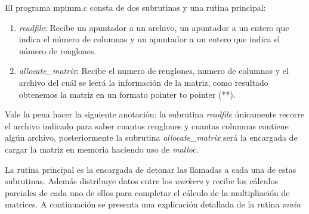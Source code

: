 \documentclass[DIV=calc, paper=letter, fontsize=11pt, twocolumn]{scrartcl}
\begin{document}
El programa mpimm.c consta de dos subrutinas y una rutina principal:

\begin{enumerate}
    \item \textit{readfile}: Recibe un apuntador a un archivo, un apuntador a un entero que indica el número de columnas y un apuntador a un entero que indica el número de renglones.
    \item \textit{allocate_matrix}: Recibe el numero de renglones, numero de columnas y el archivo del cuál se leerá la información de la matriz, como resultado obtenemos la matriz en un formato pointer to pointer (**).
\end{enumerate}

Vale la pena hacer la siguiente anotación: la subrutina \textit{readfile} únicamente recorre el archivo indicado para saber cuantos renglones y cuantas columnas contiene algún archivo, posteriormente la subrutina \textit{allocate_matrix} será la encargada de cargar la matriz en memoria haciendo uso de \textit{malloc}.

La rutina principal es la encargada de detonar las llamadas a cada una de estas subrutinas. Además distribuye datos entre los \textit{workers} y recibe los cálculos parciales de cada uno de ellos para completar el cálculo de la multipliación de matrices. A continuación se presenta una explicación detallada de la rutina \textit{main}
\end{document}
